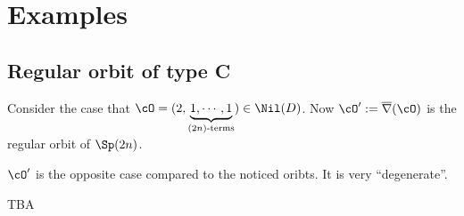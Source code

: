 \documentclass[12pt,a4paper]{amsart}
\def\eDD{\overline{\nabla}}
\numberwithin{equation}{section}
\theoremstyle{remark}
\def\cOp{\cO^{\prime}}
\begin{document}
\section{Examples}
\subsection{Regular orbit of type C}
  \label{sec:C.reg}
Consider the case that
$\cO = (2,\underbrace{1, \cdots, 1}_{(2n)\text{-terms}})\in \Nil(D)$.
Now $\cOp:=\eDD(\cO)$ is the regular orbit of $\Sp(2n)$.

$\cOp$ is the opposite case compared to the noticed oribts. It is very ``degenerate''.

{\color{red} TBA}
\end{document}
